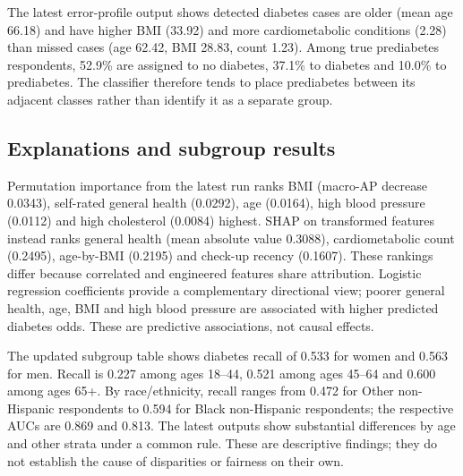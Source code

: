 

The latest error-profile output shows detected diabetes cases are older (mean age 66.18) and have higher BMI (33.92) and more cardiometabolic conditions (2.28) than missed cases (age 62.42, BMI 28.83, count 1.23). Among true prediabetes respondents, 52.9\% are assigned to no diabetes, 37.1\% to diabetes and 10.0\% to prediabetes. The classifier therefore tends to place prediabetes between its adjacent classes rather than identify it as a separate group.

\subsection{Explanations and subgroup results}
Permutation importance from the latest run ranks BMI (macro-AP decrease 0.0343), self-rated general health (0.0292), age (0.0164), high blood pressure (0.0112) and high cholesterol (0.0084) highest. SHAP on transformed features instead ranks general health (mean absolute value 0.3088), cardiometabolic count (0.2495), age-by-BMI (0.2195) and check-up recency (0.1607). These rankings differ because correlated and engineered features share attribution. Logistic regression coefficients provide a complementary directional view; poorer general health, age, BMI and high blood pressure are associated with higher predicted diabetes odds. These are predictive associations, not causal effects.



The updated subgroup table shows diabetes recall of 0.533 for women and 0.563 for men. Recall is 0.227 among ages 18--44, 0.521 among ages 45--64 and 0.600 among ages 65+. By race/ethnicity, recall ranges from 0.472 for Other non-Hispanic respondents to 0.594 for Black non-Hispanic respondents; the respective AUCs are 0.869 and 0.813. The latest outputs show substantial differences by age and other strata under a common rule. These are descriptive findings; they do not establish the cause of disparities or fairness on their own.
